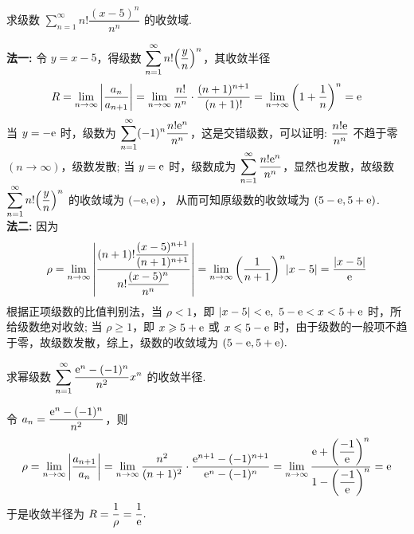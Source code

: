 \begin{example}
    求级数 $\displaystyle\sum_{n=1}^{\infty}n!\dfrac{(x-5)^n}{n^n}$ 的收敛域.
\end{example}
\begin{solution}
    \textbf{法一: }令 $y=x-5$，得级数 $\displaystyle\sum_{n=1}^{\infty}n!\qty(\dfrac{y}{n})^n$，其收敛半径
    $$R=\lim_{n\to\infty}\qty|\dfrac{a_n}{a_{n+1}}|=\lim_{n\to\infty}\dfrac{n!}{n^n}\cdot\dfrac{(n+1)^{n+1}}{(n+1)!}=\lim_{n\to\infty}\qty(1+\dfrac{1}{n})^n=\mathrm{e}$$
    当 $y=-\mathrm{e}$ 时，级数为 $\displaystyle\sum_{n=1}^{\infty}(-1)^n\dfrac{n!\mathrm{e}^n}{n^n}$，这是交错级数，可以证明: $\dfrac{n!\mathrm{e}}{n^n}$ 不趋于零 $(n\to\infty)$，级数发散;
    当 $y=\mathrm{e}$ 时，级数成为 $\displaystyle\sum_{n=1}^{\infty}\dfrac{n!\mathrm{e}^n}{n^n}$，显然也发散，故级数 $\displaystyle\sum_{n=1}^{\infty}n!\qty(\dfrac{y}{n})^n$ 的收敛域为 $(-\mathrm{e},\mathrm{e})$，
    从而可知原级数的收敛域为 $(5-\mathrm{e} ,5+\mathrm{e})$.\\
    \textbf{法二: }因为 $$\rho=\lim_{n\to\infty}\qty|\dfrac{(n+1)!\dfrac{(x-5)^{n+1}}{(n+1)^{n+1}}}{n!\dfrac{(x-5)^n}{n^n}}|=\lim_{n\to\infty}\qty(\dfrac{1}{n+1})^n|x-5|=\dfrac{|x-5|}{\mathrm{e}}$$
    根据正项级数的比值判别法，当 $\rho<1$，即 $|x-5|<\mathrm{e},~5-\mathrm{e}<x<5+\mathrm{e}$ 时，所给级数绝对收敛;
    当 $\rho\geqslant 1$，即 $x\geqslant 5+\mathrm{e}$ 或 $x\leqslant 5-\mathrm{e}$ 时，由于级数的一般项不趋于零，故级数发散，综上，级数的收敛域为 $(5-\mathrm{e},5+\mathrm{e}).$
\end{solution}


\begin{example}[2009 数三]
    求幂级数 $\displaystyle\sum_{n=1}^{\infty}\dfrac{\mathrm{e}^n-(-1)^n}{n^2}x^n$ 的收敛半径.
\end{example}
\begin{solution}
    令 $a_n=\dfrac{\mathrm{e}^n-(-1)^n}{n^2}$，则
    $$\rho=\lim_{n\to\infty}\qty|\dfrac{a_{n+1}}{a_n}|=\lim_{n\to\infty}\dfrac{n^2}{(n+1)^2}\cdot\dfrac{\mathrm{e}^{n+1}-(-1)^{n+1}}{\mathrm{e}^{n}-(-1)^n}=\lim_{n\to\infty}\dfrac{\mathrm{e}+\qty(\dfrac{-1}{\mathrm{e}})^n}{1-\qty(\dfrac{-1}{\mathrm{e}})^n}=\mathrm{e}$$
    于是收敛半径为 $R=\dfrac{1}{\rho}=\dfrac{1}{\mathrm{e}}.$
\end{solution}

